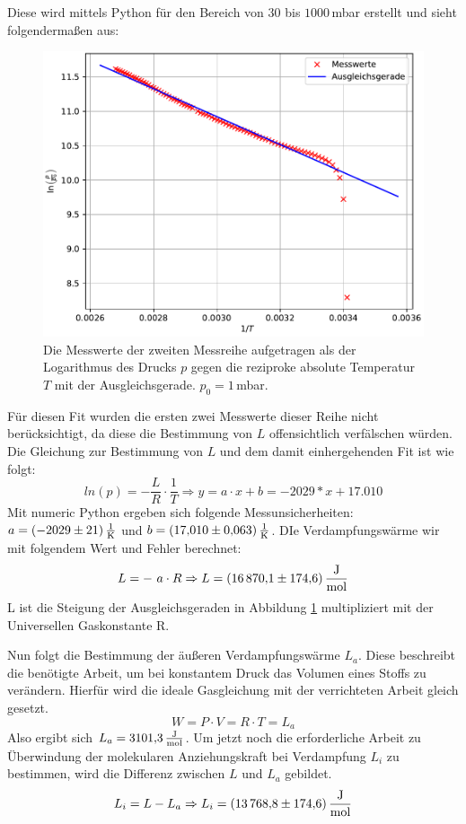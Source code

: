 Diese wird mittels Python für den Bereich von $30$ bis $1000$\,mbar erstellt und sieht folgendermaßen aus: \\
\begin{figure}[H]
  \centering
  \includegraphics[scale=0.5]{plotc.pdf}
  \caption{Die Messwerte der zweiten Messreihe aufgetragen als der Logarithmus des Drucks $p$
  gegen die reziproke absolute Temperatur $T$ mit der Ausgleichsgerade. $p_0=1$\,mbar.}
  \label{fig:Ausgleichsgerade}
\end{figure}
\newpage
Für diesen Fit wurden die ersten zwei Messwerte dieser Reihe nicht berücksichtigt, da diese die Bestimmung von $L$
offensichtlich verfälschen würden.
Die Gleichung zur Bestimmung von $L$ und dem damit einhergehenden Fit ist wie folgt:
\begin{equation}
  ln(p) = - \frac{L}{R} \cdot \frac{1}{T}
  \Rightarrow y = a \cdot x + b = -2029 * x + 17.010
\end{equation}
Mit numeric Python ergeben sich folgende Messunsicherheiten: $a = \SI{-2029 \pm 21 }{\frac{1}{\kelvin}}$
und $b = \SI{17.010 \pm 0.063}{\frac{1}{\kelvin}}$.
DIe Verdampfungswärme wir mit folgendem Wert und Fehler berechnet:
\begin{equation*}
  L = - \ a \cdot R \Rightarrow L = \SI{16870.1 \pm 174.6}{\frac{\J}{\mol}}
\end{equation*}
L ist die Steigung der Ausgleichsgeraden in Abbildung \ref{fig:Ausgleichsgerade} multipliziert mit der Universellen Gaskonstante R.

Nun folgt die Bestimmung der äußeren Verdampfungswärme $L_a$.
Diese beschreibt die benötigte Arbeit, um bei konstantem Druck das Volumen eines Stoffs zu verändern.
Hierfür wird die ideale Gasgleichung mit der verrichteten Arbeit gleich gesetzt.
\begin{equation}
    W = P \cdot V = R \cdot T = L_a
\end{equation}
Also ergibt sich $L_a = \SI{3101.3}{\frac{\J}{\mol}}$.
Um jetzt noch die erforderliche Arbeit zu Überwindung der molekularen Anziehungskraft bei Verdampfung $L_i$ zu bestimmen, wird
    die Differenz zwischen $L$ und $L_a$ gebildet.
\begin{equation}
    L_i = L - L_a \Rightarrow L_i = \SI{13768.8 \pm 174.6}{\frac{\J}{\mol}}
\end{equation}

